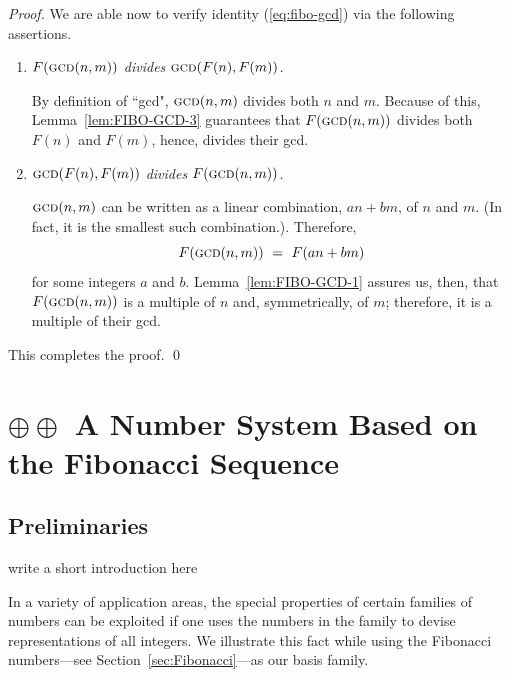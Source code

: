 \begin{proof}
\medskip

\noindent
We are able now to verify identity (\ref{eq:fibo-gcd}) via the following assertions.

\medskip

\begin{enumerate}
\item
{\em $F(\mbox{\sc gcd}(n,m))$ divides $\mbox{\sc gcd}(F(n), F(m))$.}

\smallskip

By definition of ``{\sc gcd}", $\mbox{\sc gcd}(n,m)$ divides both $n$ and $m$.  Because of this,
Lemma~\ref{lem:FIBO-GCD-3} guarantees that $F(\mbox{\sc gcd}(n,m))$ divides both $F(n)$ and $F(m)$, hence, divides their {\sc gcd}.

\medskip

\item
{\em $\mbox{\sc gcd}(F(n), F(m))$ divides $F(\mbox{\sc gcd}(n,m))$.}

\smallskip

$\mbox{\sc gcd}(n,m)$ can be written as a linear combination, $a n + b m$, of $n$ and $m$.  (In fact, it is the smallest such combination.). Therefore, 
\[ F(\mbox{\sc gcd}(n,m)) \ = \ F(a n + b m) \]
for some integers $a$ and $b$.  Lemma~\ref{lem:FIBO-GCD-1} assures us, then, that
$F(\mbox{\sc gcd}(n,m))$ is a multiple of $n$ and, symmetrically, of $m$; therefore, it is a multiple of their {\sc gcd}. 
\end{enumerate}
This completes the proof.   \qed
\end{proof}



\section{$\oplus \oplus$ A Number System Based on the Fibonacci Sequence}
\label{sec:numerals-special-families}
\label{sec:Fibo-numbers}


\subsection{Preliminaries}
{\Denis write a short introduction here}

In a variety of application areas, the special properties of certain
families of numbers can be exploited if one uses the numbers in the
family to devise representations of all integers.  We illustrate this
fact while using the Fibonacci numbers---see
Section~\ref{sec:Fibonacci}---as our basis family.

